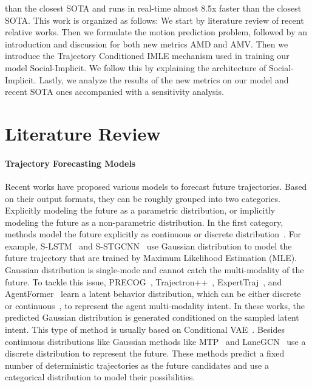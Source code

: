 \documentclass[runningheads]{llncs}
\begin{document}
than the closest SOTA and runs in real-time almost 8.5x faster than the closest SOTA. This work is organized as follows: We start by literature review of recent relative works. Then we formulate the motion prediction problem, followed by an introduction and discussion for both new metrics AMD and AMV. Then we introduce the Trajectory Conditioned IMLE mechanism used in training our model Social-Implicit. We follow this by explaining the architecture of Social-Implicit. Lastly, we analyze the results of the new metrics on our model and recent SOTA ones accompanied with a sensitivity analysis.
\section{Literature Review}
\label{sec:literature}
\paragraph{Trajectory Forecasting Models}
Recent works have proposed various models to forecast future trajectories. Based on their output formats, they can be roughly grouped into two categories. Explicitly modeling the future as a parametric distribution, or implicitly modeling the future as a non-parametric distribution.
In the first category, methods model the future explicitly as continuous or discrete distribution~\cite{alahi2016social,mohamed2020social,rhinehart2019precog,chai2019multipath,salzmann2020trajectron++,tang2019multiple,cui2019multimodal,liang2020learning,zhu2021motion,lee2017desire,rhinehart2018r2p2,yuan2021agentformer,zhao2021you}. 
For example, S-LSTM~\cite{alahi2016social} and S-STGCNN~\cite{mohamed2020social} use Gaussian distribution to model the future trajectory that are trained by Maximum Likelihood Estimation (MLE). Gaussian distribution is single-mode and cannot catch the multi-modality of the future. To tackle this issue, PRECOG~\cite{rhinehart2019precog}, Trajectron++~\cite{salzmann2020trajectron++}, ExpertTraj~\cite{zhao2021you}, and AgentFormer~\cite{yuan2021agentformer} learn a latent behavior distribution, which can be either discrete~\cite{salzmann2020trajectron++,zhao2021you}
or continuous~\cite{rhinehart2019precog,yuan2021agentformer}, to represent the agent multi-modality intent. In these works, the predicted Gaussian distribution is generated conditioned on the sampled latent intent. This type of method is usually based on Conditional VAE~\cite{sohn2015learning}.
Besides continuous distributions like Gaussian methods like MTP~\cite{cui2019multimodal} and LaneGCN~\cite{liang2020learning} use a discrete distribution to represent the future. These methods predict a fixed number of deterministic trajectories as the future candidates and use a categorical distribution to model their possibilities. 
\end{document}

